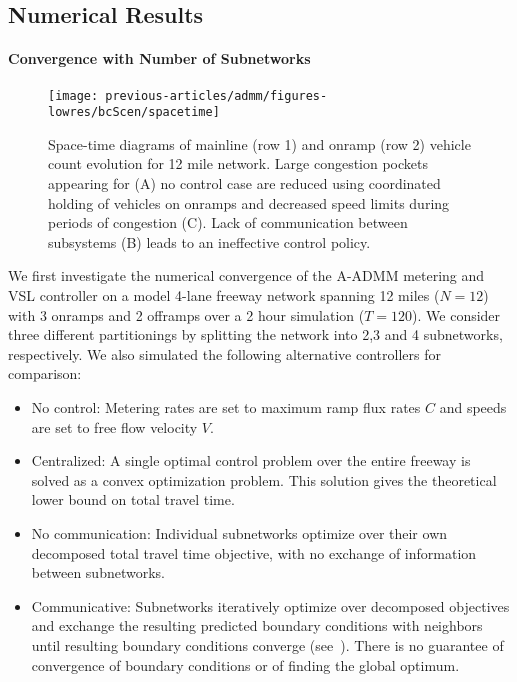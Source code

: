 \subsection{Numerical Results}
\label{sec:numerical_results-admm}

\paragraph{Convergence with Number of Subnetworks}

\begin{figure}[t]
  \centering
  \texttt{[image: previous-articles/admm/figures-lowres/bcScen/spacetime]}
  \caption[Space-time diagrams of mainline and onramp vehicle count evolution for 12 mile network depicting large congestion pockets being reduced using coordinated holding of vehicles on onramps and decreased speed limits during periods of congestion.]{Space-time diagrams of mainline (row 1) and onramp (row 2) vehicle count evolution for 12 mile network. Large congestion pockets appearing for (A) no control case are reduced using coordinated holding of vehicles on onramps and decreased speed limits during periods of congestion (C). Lack of communication between subsystems (B) leads to an ineffective control policy.}
  \label{fig:spacetime}
\end{figure}

We first investigate the numerical convergence of the A-ADMM metering and VSL controller on a model 4-lane freeway network spanning 12 miles ($N=12$) with 3 onramps and 2 offramps over a 2 hour simulation ($T=120$). We consider three different partitionings by splitting the network into 2,3 and 4 subnetworks, respectively. We also simulated the following alternative controllers for comparison:

\begin{itemize}
  \item No control: Metering rates are set to maximum ramp flux rates $C$ and speeds are set to free flow velocity $V$.
  \item Centralized: A single optimal control problem over the entire freeway is solved as a convex optimization problem. This solution gives the theoretical lower bound on total travel time.
  \item No communication: Individual subnetworks optimize over their own decomposed total travel time objective, with no exchange of information between subnetworks.
  \item Communicative: Subnetworks iteratively optimize over decomposed objectives and exchange the resulting predicted boundary conditions with neighbors until resulting boundary conditions converge (see~\cite{Frejo2011}). There is no guarantee of convergence of boundary conditions or of finding the global optimum.
\end{itemize}

